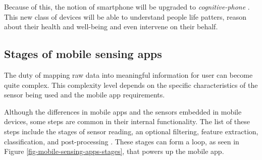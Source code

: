 Because of this, the notion of smartphone will be upgraded to \emph{cognitive-phone} \cite{Campbell2012}.
This new class of devices will be able to understand people life patters, reason about their health and well-being and even intervene on their behalf.


\subsection{Stages of mobile sensing apps}
\label{sub:stages_of_mobile_sensing_apps}

The duty of mapping raw data into meaningful information for user can become quite complex.
This complexity level depends on the specific characteristics of the sensor being used and the mobile app requirements.

Although the differences in mobile apps and the sensors embedded in mobile devices, some steps are common in their internal functionality.
The list of these steps include the stages of sensor reading, an optional filtering, feature extraction, classification, and post-processing \cite{Ra2012}.
These stages can form a loop, as seen in Figure \ref{fig-mobile-sensing-apps-stages}, that powers up the mobile app.

